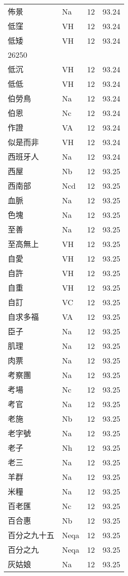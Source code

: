 \documentclass[twocolumn]{book}
\begin{document}
\begin{supertabular}{llrr}
佈景 & Na & 12 &  93.24\\
低窪 & VH & 12 &  93.24\\
低矮 & VH & 12 &  93.24\\
26250\\
低沉 & VH & 12 &  93.24\\
低低 & VH & 12 &  93.24\\
伯勞鳥 & Na & 12 &  93.24\\
伯恩 & Nc & 12 &  93.24\\
作證 & VA & 12 &  93.24\\
似是而非 & VH & 12 &  93.24\\
西班牙人 & Na & 12 &  93.24\\
西屋 & Nb & 12 &  93.25\\
西南部 & Ncd & 12 &  93.25\\
血脈 & Na & 12 &  93.25\\
色塊 & Na & 12 &  93.25\\
至善 & Na & 12 &  93.25\\
至高無上 & VH & 12 &  93.25\\
自愛 & VH & 12 &  93.25\\
自許 & VH & 12 &  93.25\\
自重 & VH & 12 &  93.25\\
自訂 & VC & 12 &  93.25\\
自求多福 & VA & 12 &  93.25\\
臣子 & Na & 12 &  93.25\\
肌理 & Na & 12 &  93.25\\
肉票 & Na & 12 &  93.25\\
考察團 & Na & 12 &  93.25\\
考場 & Nc & 12 &  93.25\\
考官 & Na & 12 &  93.25\\
老施 & Nb & 12 &  93.25\\
老字號 & Na & 12 &  93.25\\
老子 & Nh & 12 &  93.25\\
老三 & Na & 12 &  93.25\\
羊群 & Na & 12 &  93.25\\
米糧 & Na & 12 &  93.25\\
百老匯 & Nc & 12 &  93.25\\
百合惠 & Nb & 12 &  93.25\\
百分之九十五 & Neqa & 12 &  93.25\\
百分之九 & Neqa & 12 &  93.25\\
灰姑娘 & Na & 12 &  93.25\\

\end{supertabular}
\end{document}

